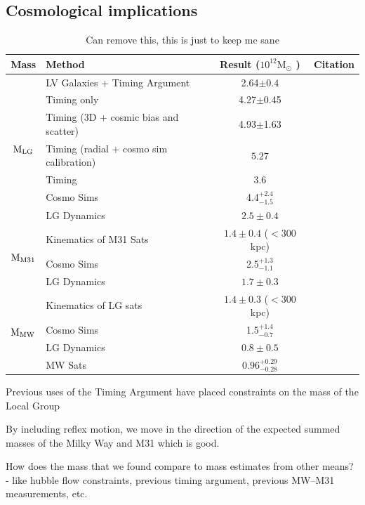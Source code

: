 \documentclass[twocolumn]{aastex631}
\newcommand{\mlg}{\ensuremath{\textrm{M}_{\rm LG}}}
\newcommand{\mmto}{\ensuremath{\textrm{M}_{\rm M31}}}
\newcommand{\mmw}{\ensuremath{\textrm{M}_{\rm MW}}}
\newcommand{\msun}{\ensuremath{\textrm{M}_{\odot}}}
\begin{document}
\subsection{Cosmological implications}
\begin{table}
  \centering
  \begin{tabular}{clc|c}
    \hline\hline
    Mass & Method & Result ($ 10^{12}\msun$ ) & Citation \\\hline
    \multirow{7}{*}{\mlg}  &{LV Galaxies + Timing Argument} & {2.64$\pm0.4$} & \cite{Penarrubia2016} \\
    &{Timing only} & {4.27$\pm$0.45} & \cite{vdm2012} \\
    &{Timing (3D + cosmic bias and scatter)} & {4.93$\pm$1.63} & \cite{vdm2012} \\
    &Timing (radial + cosmo sim calibration)  & $5.27$& \cite{LiWhite2008} \\
    &Timing & $3.6$ & \cite{Lynden-Bell:1981} \\
    & Cosmo Sims & 4.4$^{+2.4}_{-1.5}$ & \cite{Zhai2020}\\
    & LG Dynamics &$2.5\pm0.4$ & \cite{Diaz2014}\\
    \hline
    \multirow{3}{*}{\mmto}& Kinematics of M31 Sats & $1.4 \pm 0.4$ ($<$300 kpc) & \cite{Watkins2010}\\
    & Cosmo Sims & 2.5$^{+1.3}_{-1.1}$ & \cite{Zhai2020}\\
    & LG Dynamics &$1.7\pm0.3$ & \cite{Diaz2014}\\
    \hline
    \multirow{4}{*}{\mmw}&  Kinematics of LG sats & $1.4 \pm 0.3$ ($<$300 kpc) & \cite{Watkins2010}\\
    & Cosmo Sims & 1.5$^{+1.4}_{-0.7}$ & \cite{Zhai2020} \\
    & LG Dynamics &$0.8\pm0.5$ & \cite{Diaz2014}\\
    & MW Sats & $0.96^{+0.29}_{-0.28}$ & \cite{Patel2017}\\
  \hline\hline
  \end{tabular}
  \caption{\label{table:masses}Can remove this, this is just to keep me sane}
\end{table}
Previous uses of the Timing Argument have placed constraints on the mass of the Local Group 

By including reflex motion, we move in the direction of the expected summed masses of the Milky Way and M31 which is good.

How does the mass that we found compare to mass estimates from other means? 
- like hubble flow constraints, previous timing argument, previous MW--M31 measurements, etc.
\end{document}
